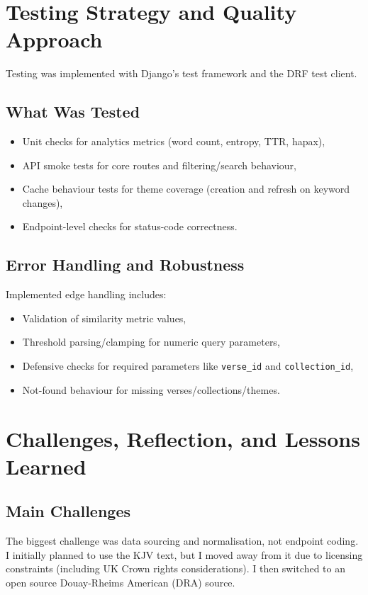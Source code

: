 \documentclass[11pt,a4paper]{article}
\begin{document}
\section{Testing Strategy and Quality Approach}
Testing was implemented with Django's test framework and the DRF test client.

\subsection{What Was Tested}
\begin{itemize}[leftmargin=*]
	\item Unit checks for analytics metrics (word count, entropy, TTR, hapax),
	\item API smoke tests for core routes and filtering/search behaviour,
	\item Cache behaviour tests for theme coverage (creation and refresh on keyword changes),
	\item Endpoint-level checks for status-code correctness.
\end{itemize}

\subsection{Error Handling and Robustness}
Implemented edge handling includes:
\begin{itemize}[leftmargin=*]
	\item Validation of similarity metric values,
	\item Threshold parsing/clamping for numeric query parameters,
	\item Defensive checks for required parameters like \texttt{verse\_id} and \texttt{collection\_id},
	\item Not-found behaviour for missing verses/collections/themes.
\end{itemize}

\section{Challenges, Reflection, and Lessons Learned}
\subsection{Main Challenges}
The biggest challenge was data sourcing and normalisation, not endpoint coding. I initially planned to use the KJV text, but I moved away from it due to licensing constraints (including UK Crown rights considerations). I then switched to an open source Douay-Rheims American (DRA) source.
\end{document}

